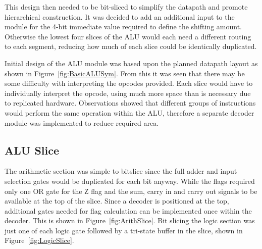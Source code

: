 This design then needed to be bit-sliced to simplify the datapath and promote hierarchical construction. 
It was decided to add an additional input to the module for the 4-bit immediate value required to define the shifting amount. 
Otherwise the lowest four slices of the ALU would each need a different routing to each segment, reducing how much of each slice could be identically duplicated. 

Initial design of the ALU module was based upon the planned datapath layout as shown in Figure~\ref{fig:BasicALUSym}. 
From this it was seen that there may be some difficulty with interpreting the opcodes provided. 
Each slice would have to individually interpret the opcode, using much more space than is necessary due to replicated hardware. 
Observations showed that different groups of instructions would perform the same operation within the ALU, therefore a separate decoder module was implemented to reduce required area.

\subsection{ALU Slice}
The arithmetic section was simple to bitslice since the full adder and input selection gates would be duplicated for each bit anyway. 
While the flags required only one OR gate for the Z flag and the sum, carry in and carry out signals to be available at the top of the slice. 
Since a decoder is positioned at the top, additional gates needed for flag calculation can be implemented once within the decoder. 
This is shown in Figure~\ref{fig:ArithSlice}. 
Bit slicing the logic section was just one of each logic gate followed by a tri-state buffer in the slice, shown in Figure~\ref{fig:LogicSlice}. 

